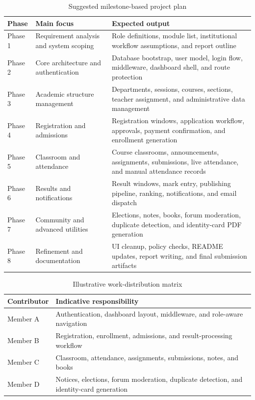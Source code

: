 \documentclass[12pt,a4paper]{report}
\begin{document}
\begin{table}[H]
  \centering
  \caption{Suggested milestone-based project plan}
  \label{tab:milestone-plan}
  \renewcommand{\arraystretch}{1.2}
  \begin{tabularx}{\textwidth}{p{1.0in}p{2.2in}Y}
    \toprule
    \textbf{Phase} & \textbf{Main focus} & \textbf{Expected output} \\
    \midrule
    Phase 1 & Requirement analysis and system scoping & Role definitions, module list, institutional workflow assumptions, and report outline \\
    Phase 2 & Core architecture and authentication & Database bootstrap, user model, login flow, middleware, dashboard shell, and route protection \\
    Phase 3 & Academic structure management & Departments, sessions, courses, sections, teacher assignment, and administrative data management \\
    Phase 4 & Registration and admissions & Registration windows, application workflow, approvals, payment confirmation, and enrollment generation \\
    Phase 5 & Classroom and attendance & Course classrooms, announcements, assignments, submissions, live attendance, and manual attendance records \\
    Phase 6 & Results and notifications & Result windows, mark entry, publishing pipeline, ranking, notifications, and email dispatch \\
    Phase 7 & Community and advanced utilities & Elections, notes, books, forum moderation, duplicate detection, and identity-card PDF generation \\
    Phase 8 & Refinement and documentation & UI cleanup, policy checks, README updates, report writing, and final submission artifacts \\
    \bottomrule
  \end{tabularx}
\end{table}

\begin{table}[H]
  \centering
  \caption{Illustrative work-distribution matrix}
  \label{tab:work-distribution}
  \renewcommand{\arraystretch}{1.2}
  \begin{tabularx}{\textwidth}{p{1.3in}Y}
    \toprule
    \textbf{Contributor} & \textbf{Indicative responsibility} \\
    \midrule
    Member A & Authentication, dashboard layout, middleware, and role-aware navigation \\
    Member B & Registration, enrollment, admissions, and result-processing workflow \\
    Member C & Classroom, attendance, assignments, submissions, notes, and books \\
    Member D & Notices, elections, forum moderation, duplicate detection, and identity-card generation \\
    \bottomrule
  \end{tabularx}
\end{table}
\end{document}
